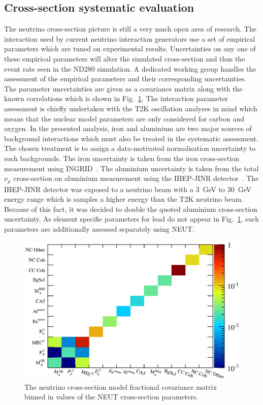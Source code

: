 \subsection{Cross-section systematic evaluation}
\label{subsec:CrossSectionSystematic}
The neutrino cross-section picture is still a very much open area of research.  The interaction  used by current neutrino interaction generators use a set of empirical parameters which are tuned on experimental results.  Uncertainties on any one of these empirical parameters will alter the simulated cross-section and thus the event rate seen in the ND280 simulation.  A dedicated working group handles the assessment of the empirical parameters and their corresponding uncertainties.  The parameter uncertainties are given as a covariance matrix along with the known correlations which is shown in Fig.~\ref{fig:XSecPredictionSyst}.  The interaction parameter assessment is chiefly undertaken with the T2K oscillation analyses in mind which means that the nuclear model parameters are only considered for carbon and oxygen.  In the presented analysis, iron and aluminium are two major sources of background interactions which must also be treated in the systematic assessment.  The chosen treatment is to assign a data-motivated normalisation uncertainty to such backgrounds.  The iron uncertainty is taken from the iron cross-section measurement using INGRID~\cite{PhysRevD.90.052010}.  The aluminium uncertainty is taken from the total $\nu_\mu$ cross-section on aluminium measurement using the IHEP-JINR detector~\cite{Anikeev:1995dj}.  The IHEP-JINR detector was exposed to a neutrino beam with a 3~GeV to 30~GeV energy range which is samples a higher energy than the T2K neutrino beam.  Because of this fact, it was decided to double the quoted aluminium cross-section uncertainty.  As element specific parameters for lead do not appear in Fig.~\ref{fig:XSecPredictionSyst}, such parameters are additionally assessed separately using NEUT.
\begin{figure}
  \centering
  \includegraphics[width=12cm]{images/measurement/systematics/xsec/xsec_prediction_syst.eps}
  \caption{The neutrino cross-section model fractional covariance matrix binned in values of the NEUT cross-section parameters.}
  \label{fig:XSecPredictionSyst}
\end{figure}
